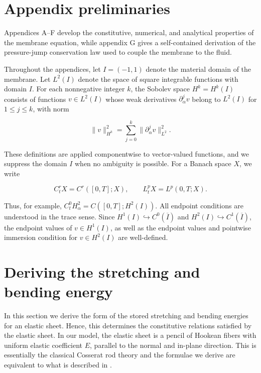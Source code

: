 \documentclass{article}[12pt]
\theoremstyle{Theorem}
\begin{document}
\vspace{2cm}

\appendix
\section*{Appendix preliminaries}
Appendices A–F develop the constitutive, numerical, and analytical properties of the membrane equation, while appendix G gives a self-contained derivation of the pressure-jump conservation law used to couple the membrane to the fluid.
\newline 

Throughout the appendices, let \(I=(-1,1)\) denote the material domain of the membrane. Let $L^2(I)$ denote the space of square integrable functions with domain $I$. For each nonnegative integer \(k\), the Sobolev space $H^k = H^k(I)$ consists of functions \(v\in L^2(I)\) whose weak derivatives \(\partial_\alpha^jv\) belong to \(L^2(I)\) for \(1\leq j\leq k\), with norm

$$
\|v\|_{H^k}^2
=
\sum_{j=0}^k
\|\partial_\alpha^jv\|_{L^2}^2.
$$

These definitions are applied componentwise to vector-valued functions, and we suppress the domain \(I\) when no ambiguity is possible. For a Banach space \(X\), we write

$$
C_t^rX=C^r([0,T];X),
\qquad
L_t^pX=L^p(0,T;X).
$$

Thus, for example, \(C_t^0H_\alpha^2=C([0,T];H^2(I))\). All endpoint conditions are understood in the trace sense. Since \(H^1(I)\hookrightarrow C^0(\overline I)\) and \(H^2(I)\hookrightarrow C^1(\overline I)\), the endpoint values of \(v\in H^1(I)\), as well as the endpoint values and pointwise immersion condition for \(v\in H^2(I)\) are well-defined.

\section{Deriving the stretching and bending energy}
\label{bending and stretching energy derivation appendix}
In this section we derive the form of the stored stretching and bending energies for an elastic sheet. Hence, this determines the constitutive relations satisfied by the elastic sheet. In our model, the elastic sheet is a pencil of Hookean fibers with uniform elastic coefficient $E$, parallel to the normal and in-plane direction. This is essentially the classical Cosserat rod theory and the formulae we derive are equivalent to what is described in \cite[98-105]{antman2005nonlinear}.
\newline
\end{document}
